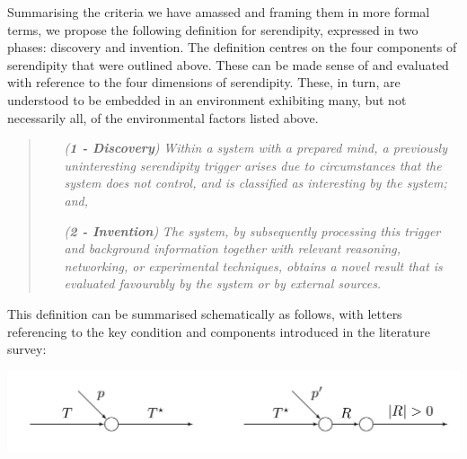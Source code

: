Summarising the criteria we have amassed and framing them in more
formal terms, we propose the following definition for serendipity,
expressed in two phases: discovery and invention.  The definition
centres on the four components of serendipity that were outlined
above.  These can be made sense of and evaluated with reference to the
four dimensions of serendipity.  These, in turn, are understood to be
embedded in an environment exhibiting many, but not necessarily all,
of the environmental factors listed above.

\begin{quote}
\begin{enumerate}[itemsep=2pt,labelwidth=9em,leftmargin=6em,rightmargin=2em]
\item[\emph{(\textbf{1 - Discovery})}] \emph{Within a system with a prepared mind, a previously uninteresting serendipity trigger arises due to circumstances that the system does not control, and is classified as interesting by the system; and,}
\item[\emph{(\textbf{2 - Invention})}] \emph{The system, by subsequently processing this trigger and background information together with relevant reasoning, networking, or experimental techniques, obtains a novel result that is evaluated favourably by the system or by external sources.}
\end{enumerate}
\end{quote}

\noindent This definition can be summarised schematically as follows, with letters referencing to the key condition and components introduced in the literature survey: 

% 
{\centering
\includegraphics[width=.8\textwidth]{schematic}
\par}

